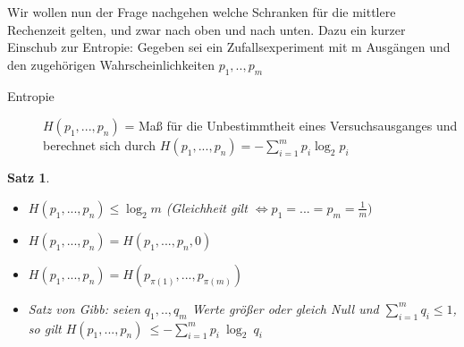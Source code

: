 \documentclass[ngerman,draft,parskip=half*,twoside]{scrreprt}
\theoremstyle{break}
\newtheorem{satz}{Satz}
\begin{document}
Wir wollen nun der Frage nachgehen welche Schranken für die mittlere Rechenzeit gelten, und zwar nach oben und nach unten.
Dazu ein kurzer Einschub zur Entropie:
Gegeben sei ein Zufallsexperiment mit m Ausgängen und den zugehörigen Wahrscheinlichkeiten $p_1,..,p_m$
\begin{description}
    \item[Entropie] $H(p_1,...,p_n)$ = Maß für die Unbestimmtheit eines Versuchsausganges und berechnet sich durch
     $H(p_1,...,p_n)=-\sum_{i=1}^m p_i\log_2 p_i$
\end{description}

\begin{satz}
 \begin{itemize}
    \item $H(p_1,...,p_n)\leq\log_2 m$ (Gleichheit gilt
      $\Leftrightarrow p_1=...=p_m=\frac{1}{m})$
    \item $H(p_1,...,p_n) = H(p_1,...,p_n,0)$
    \item $H(p_1,...,p_n)=H(p_{\pi(1)},...,p_{\pi(m)})$
    \item Satz von Gibb: seien $q_1,..,q_m$ Werte größer oder gleich Null und $\sum_{i=1}^m q_i\leq1$, so gilt
     $H(p_1,...,p_n)\:\leq-\sum_{i=1}^m p_i\:\log_2\:q_i$
 \end{itemize}
\end{satz}
\end{document}
